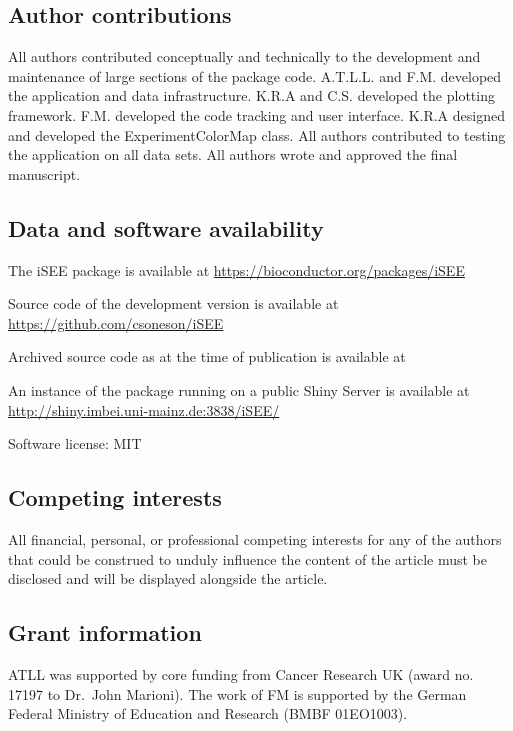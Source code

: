 \documentclass[10pt,a4paper,twocolumn]{article}
\begin{document}
\subsection*{Author contributions}
All authors contributed conceptually and technically to the development and maintenance of large sections of the package code.
A.T.L.L. and F.M. developed the application and data infrastructure.
K.R.A and C.S. developed the plotting framework.
F.M. developed the code tracking and user interface.
K.R.A designed and developed the ExperimentColorMap class.
All authors contributed to testing the application on all data sets.
All authors wrote and approved the final manuscript.

\subsection*{Data and software availability}
The iSEE package is available at \url{https://bioconductor.org/packages/iSEE}

Source code of the development version is available at \url{https://github.com/csoneson/iSEE}

Archived source code as at the time of publication is available at %

An instance of the package running on a public Shiny Server is available at \url{http://shiny.imbei.uni-mainz.de:3838/iSEE/}



Software license: MIT


\subsection*{Competing interests}
All financial, personal, or professional competing interests for any of the authors that
could be construed to unduly influence the content of the article must be disclosed and
will be displayed alongside the article.

\subsection*{Grant information}
ATLL was supported by core funding from Cancer Research UK (award no. 17197 to Dr.\ John Marioni).
The work of FM is supported by the German Federal Ministry of Education and Research (BMBF 01EO1003).
\end{document}
